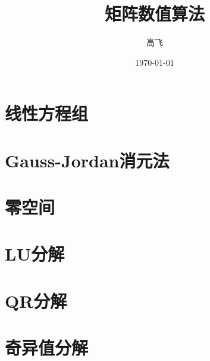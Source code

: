 \documentclass[UTF8]{ctexart}
\title{矩阵数值算法}
\author{高飞}
\date{\today}
\begin{document}
\maketitle
\newpage

\tableofcontents
\newpage

\section{线性方程组}

\section{Gauss-Jordan消元法}

\section{零空间}

\section{LU分解}

\section{QR分解}


\section{奇异值分解}
\end{document}
